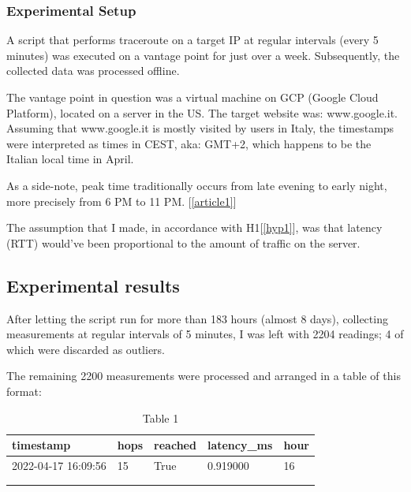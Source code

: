 \documentclass[a4paper,10pt]{article}
\begin{document}
\maketitle
\subsubsection{Experimental Setup}

A script that performs traceroute on a target IP at regular intervals (every 5 minutes) was executed on a vantage point for just over a week. Subsequently, the collected data was processed offline. 

The vantage point in question was a virtual machine on GCP (Google Cloud Platform), located on a server in the US. The target website was: www.google.it. Assuming that www.google.it is mostly visited by users in Italy, the timestamps were interpreted as times in CEST, aka: GMT+2, which happens to be the Italian local time in April.

As a side-note, peak time traditionally occurs from late evening to early night, more precisely from 6 PM to 11 PM. [\ref{article1}]

The assumption that I made, in accordance with H1[\ref{hyp1}], was that latency (RTT) would've been proportional to the amount of traffic on the server. 

\subsection{Experimental results}

After letting the script run for more than 183 hours (almost 8 days), collecting measurements at regular intervals of 5 minutes, I was left with 2204 readings; 4 of which were discarded as outliers. 

The remaining 2200 measurements were processed and arranged in a table of this format:

\clearpage

\begin{table}[h!]
\centering
\begin{tabular}{|l|l|l|l|l|}
\hline
timestamp           & hops & reached & latency\_ms & hour \\ \hline
2022-04-17 16:09:56 & 15   & True    & 0.919000    & 16   \\ \hline
                    &      &         &             &      \\ \hline
                    &      &         &             &     
\end{tabular}
\caption{Table 1}
\label{fig:table1}
\end{table}
\end{document}
